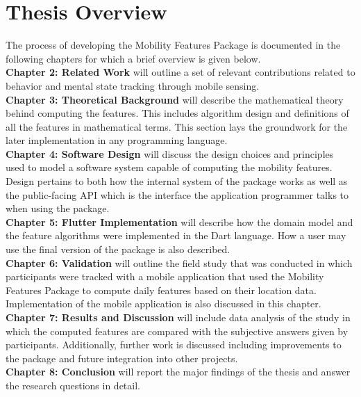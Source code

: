 \section{Thesis Overview}
The process of developing the Mobility Features Package is documented in the following chapters for which a brief overview is given below.\\

\textbf{Chapter 2: Related Work} will outline a set of relevant contributions related to behavior and mental state tracking through mobile sensing. \\

\textbf{Chapter 3: Theoretical Background} will describe the mathematical theory behind computing the features. This includes algorithm design and definitions of all the features in mathematical terms. This section lays the groundwork for the later implementation in any programming language.\\

\textbf{Chapter 4: Software Design} will discuss the design choices and principles used to model a software system capable of computing the mobility features. Design pertains to both how the internal system of the package works as well as the public-facing API which is the interface the application programmer talks to when using the package.\\

\textbf{Chapter 5: Flutter Implementation} will describe how the domain model and the feature algorithms were implemented in the Dart language. How a user may use the final version of the package is also described.\\

\textbf{Chapter 6: Validation} will outline the field study that was conducted in which participants were tracked with a mobile application that used the Mobility Features Package to compute daily features based on their location data. Implementation of the mobile application is also discussed in this chapter.\\

\textbf{Chapter 7: Results and Discussion} will include data analysis of the study in which the computed features are compared with the subjective answers given by participants. Additionally, further work is discussed including improvements to the package and future integration into other projects.\\

\textbf{Chapter 8: Conclusion} will report the major findings of the thesis and answer the research questions in detail.\\